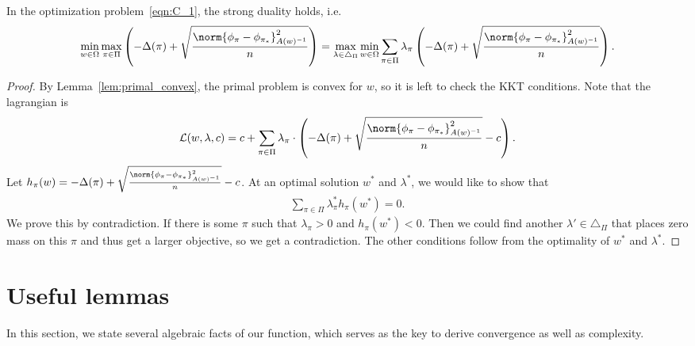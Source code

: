 \documentclass{article}
\newcommand{\1}{\mathbf{1}}
\begin{document}
\begin{lemma}\label{lem:strong_duality}
In the optimization problem~\ref{eqn:C_1}, the strong duality holds, i.e. 
{
\small
\[\min_{w\in\Omega}\max_{\pi\in\Pi}\left(-\Delta(\pi)+\sqrt{\frac{\norm{\phi_{\pi}-\phi_{\pi_*}}_{A(w)^{-1}}^2}{n}}\right)=\max_{\lambda\in\triangle_\Pi}\min_{w\in\Omega}\sum_{\pi\in\Pi}\lambda_\pi\left(-\Delta(\pi)+\sqrt{\frac{\norm{\phi_{\pi}-\phi_{\pi_*}}_{A(w)^{-1}}^2}{n}}\right).\]
}
\end{lemma}
\begin{proof}
By Lemma~\ref{lem:primal_convex}, the primal problem is convex for $w$, so it is left to check the KKT conditions. Note that the lagrangian is 
\[\mathcal{L}(w,\lambda,c)=c+\sum_{\pi\in\Pi}\lambda_\pi\cdot\left(-\Delta(\pi)+\sqrt{\frac{\norm{\phi_{\pi}-\phi_{\pi_*}}_{A(w)^{-1}}^2}{n}}-c\right).\]
Let $h_\pi(w)=-\Delta(\pi)+\sqrt{\frac{\norm{\phi_{\pi}-\phi_{\pi_*}}_{A(w)^{-1}}^2}{n}}-c$. At an optimal solution $w^*$ and $\lambda^*$, we would like to show that
\begin{align*}
    \sum_{\pi\in\Pi}\lambda_\pi^* h_\pi(w^*)=0.
\end{align*}
We prove this by contradiction. If there is some $\pi$ such that $\lambda_\pi>0$ and $h_\pi(w^*)<0$. Then we could find another $\lambda'\in\triangle_\Pi$ that places zero mass on this $\pi$ and thus get a larger objective, so we get a contradiction. The other conditions follow from the optimality of $w^*$ and $\lambda^*$.  
\end{proof}

\section{Useful lemmas}
In this section, we state several algebraic facts of our function, which serves as the key to derive convergence as well as complexity. 
\end{document}
